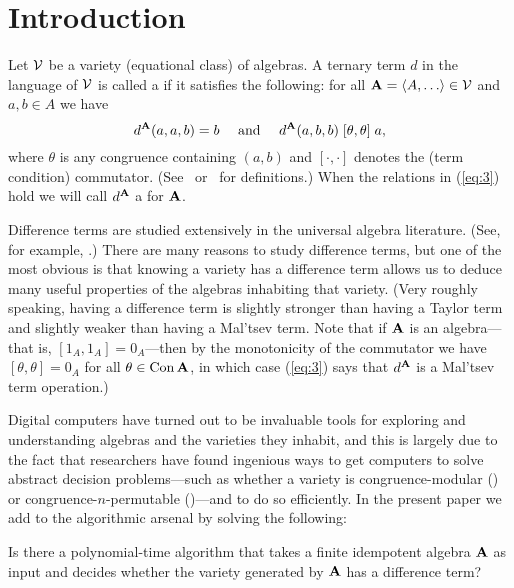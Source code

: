 \section{Introduction}
\label{sec:introduction}


Let $\mathcal{V}$ be a variety (equational class) of algebras.
A ternary term $d$ in the language of $\mathcal{V}$ is called 
a  if it satisfies the following:
for all $\bA = \<A, \dots \> \in \sV$ and $a, b \in A$ we have
\begin{equation}
\label{eq:3}  
d^{\bA}(a,a,b) = b \quad \text{ and } \quad
d^{\bA}(a,b,b) \comm \theta \theta a,
\end{equation}
where $\theta$ is any congruence %
containing $(a,b)$
and $[\cdot, \cdot]$ denotes the (term condition) commutator.
(See~\cite{HM:1988} or~\cite{MR3076179} for definitions.)
When the relations in (\ref{eq:3}) hold we will call $d^{\mathbf{A}}$
a  for $\mathbf{A}$.


Difference terms are studied extensively in the universal algebra literature.
(See, for example, \cite{HM:1988,MR1358491,MR3076179,MR1663558,MR3449235,KSW}.)
There are many reasons to study difference terms, but
one of the most obvious is that knowing a variety 
has a difference term allows us to deduce many useful
properties of the algebras inhabiting that variety.
(Very roughly speaking, having a difference term is slightly stronger than having
a Taylor term and slightly weaker than having a Mal'tsev term.
Note that if
$\mathbf{A}$ is an  algebra---that is, $[1_A, 1_A] = 0_A$---then by
the monotonicity of the commutator we have
$[\theta, \theta] = 0_A$ for all $\theta \in \operatorname{Con} \mathbf{A}$, in which case
(\ref{eq:3}) says that $d^{\mathbf{A}}$ is a Mal'tsev term operation.)

Digital computers have turned out to be invaluable tools for exploring and
understanding algebras and the varieties they inhabit, and this is largely due
to the fact that researchers have found ingenious ways
to get computers to solve abstract decision problems---such as
whether a variety is 
congruence-modular (\cite{Freese:2009}) or
congruence-$n$-permutable (\cite{MR3239624})---and to do so efficiently.
In the present paper we add to the algorithmic arsenal
by solving the following:
\begin{prob}
  \label{prob:1}
  Is there a polynomial-time algorithm that takes a finite
  idempotent algebra $\mathbf{A}$ as input and decides whether the variety generated by
  $\mathbf{A}$ has a difference term?
\end{prob}

